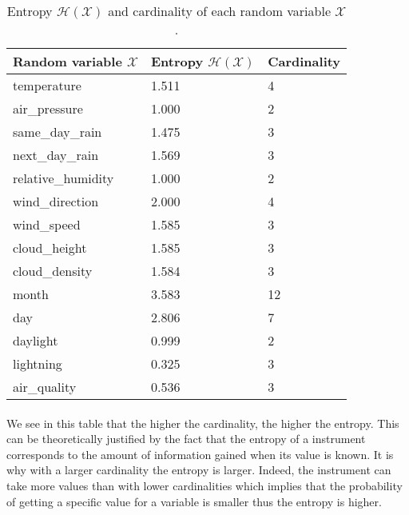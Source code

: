\documentclass[a4paper, 11pt, oneside]{article}
\begin{document}
\begin{table}[H]
    \centering
    \begin{tabular}{|l|l|l|}
    \hline
    \textbf{Random variable $\mathcal{X}$} & \textbf{Entropy $\mathcal{H}(\mathcal{X})$} & \textbf{Cardinality} \\ \hline
    temperature            & 1.511            & 4                    \\ \hline
    air\_pressure          & 1.000            & 2                    \\ \hline
    same\_day\_rain        & 1.475            & 3                    \\ \hline
    next\_day\_rain        & 1.569            & 3                    \\ \hline
    relative\_humidity     & 1.000            & 2                    \\ \hline
    wind\_direction        & 2.000            & 4                    \\ \hline
    wind\_speed            & 1.585            & 3                    \\ \hline
    cloud\_height          & 1.585            & 3                    \\ \hline
    cloud\_density         & 1.584            & 3                    \\ \hline
    month                  & 3.583            & 12                   \\ \hline
    day                    & 2.806            & 7                    \\ \hline
    daylight               & 0.999            & 2                    \\ \hline
    lightning              & 0.325            & 3                    \\ \hline
    air\_quality           & 0.536            & 3                    \\ \hline
    \end{tabular}
    \caption{Entropy $\mathcal{H}(\mathcal{X})$ and cardinality of each random variable $\mathcal{X}$.}
    \label{table:q6}
    \end{table}

\paragraph{}We see in this table that the higher the cardinality, the higher the entropy. This can be theoretically justified by the fact that the 
entropy of a instrument corresponds to the amount of information gained when its value is known. It is why with a larger cardinality the entropy is larger. Indeed,
the instrument can take more values than with lower cardinalities which implies that the probability of getting a specific value for a variable is smaller thus the entropy is higher.
\end{document}

